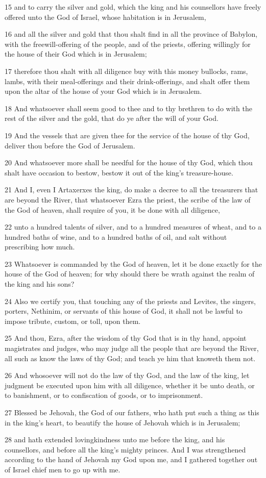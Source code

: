 \par 15 and to carry the silver and gold, which the king and his counsellors have freely offered unto the God of Israel, whose habitation is in Jerusalem,
\par 16 and all the silver and gold that thou shalt find in all the province of Babylon, with the freewill-offering of the people, and of the priests, offering willingly for the house of their God which is in Jerusalem;
\par 17 therefore thou shalt with all diligence buy with this money bullocks, rams, lambs, with their meal-offerings and their drink-offerings, and shalt offer them upon the altar of the house of your God which is in Jerusalem.
\par 18 And whatsoever shall seem good to thee and to thy brethren to do with the rest of the silver and the gold, that do ye after the will of your God.
\par 19 And the vessels that are given thee for the service of the house of thy God, deliver thou before the God of Jerusalem.
\par 20 And whatsoever more shall be needful for the house of thy God, which thou shalt have occasion to bestow, bestow it out of the king's treasure-house.
\par 21 And I, even I Artaxerxes the king, do make a decree to all the treasurers that are beyond the River, that whatsoever Ezra the priest, the scribe of the law of the God of heaven, shall require of you, it be done with all diligence,
\par 22 unto a hundred talents of silver, and to a hundred measures of wheat, and to a hundred baths of wine, and to a hundred baths of oil, and salt without prescribing how much.
\par 23 Whatsoever is commanded by the God of heaven, let it be done exactly for the house of the God of heaven; for why should there be wrath against the realm of the king and his sons?
\par 24 Also we certify you, that touching any of the priests and Levites, the singers, porters, Nethinim, or servants of this house of God, it shall not be lawful to impose tribute, custom, or toll, upon them.
\par 25 And thou, Ezra, after the wisdom of thy God that is in thy hand, appoint magistrates and judges, who may judge all the people that are beyond the River, all such as know the laws of thy God; and teach ye him that knoweth them not.
\par 26 And whosoever will not do the law of thy God, and the law of the king, let judgment be executed upon him with all diligence, whether it be unto death, or to banishment, or to confiscation of goods, or to imprisonment.
\par 27 Blessed be Jehovah, the God of our fathers, who hath put such a thing as this in the king's heart, to beautify the house of Jehovah which is in Jerusalem;
\par 28 and hath extended lovingkindness unto me before the king, and his counsellors, and before all the king's mighty princes. And I was strengthened according to the hand of Jehovah my God upon me, and I gathered together out of Israel chief men to go up with me.

